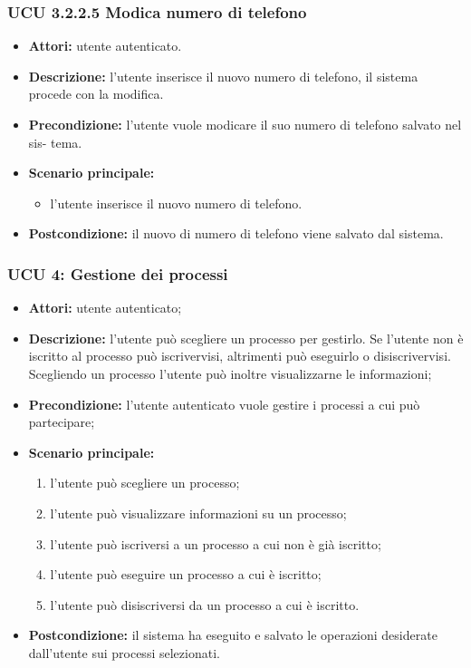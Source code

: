 \subsubsection{UCU 3.2.2.5  Modica numero di telefono}
\begin{itemize}
\item \textbf{Attori: } utente autenticato.
\item \textbf{Descrizione: }l'utente inserisce il nuovo numero di telefono, il sistema procede con la modifica.
\item \textbf{Precondizione: } l'utente vuole modicare il suo numero di telefono salvato nel sis-
tema.
\item \textbf{Scenario principale:}
	\begin{itemize}
		\item l'utente inserisce il nuovo numero di telefono.
	\end{itemize}
\item \textbf{Postcondizione:} il nuovo di numero di telefono viene salvato dal sistema.
\end{itemize}

\subsubsection{UCU 4: Gestione dei processi}
\begin{itemize}
\item \textbf{Attori:} utente autenticato;
\item \textbf{Descrizione:} l'utente può scegliere un processo per gestirlo.
Se l'utente non è iscritto al processo può iscrivervisi, altrimenti può eseguirlo o disiscrivervisi.
Scegliendo un processo l'utente può inoltre visualizzarne le informazioni;
\item \textbf{Precondizione:} l'utente autenticato vuole gestire i processi a cui può partecipare;
\item \textbf{Scenario principale:}
\begin{enumerate}
\item l'utente può scegliere un processo;
\item l'utente può visualizzare informazioni su un processo;
\item l'utente può iscriversi a un processo a cui non è già iscritto;
\item l'utente può eseguire un processo a cui è iscritto;
\item l'utente può disiscriversi da un processo a cui è iscritto.
\end{enumerate}
\item \textbf{Postcondizione:} il sistema ha eseguito e salvato le operazioni desiderate dall'utente sui processi selezionati.
\end{itemize}

